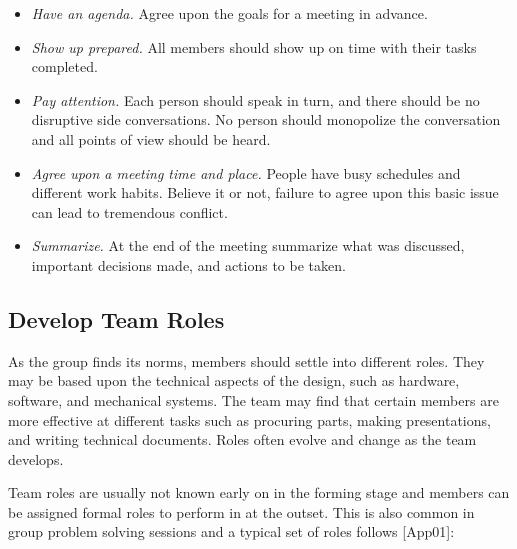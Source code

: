 \begin{itemize}
\item
  \emph{Have an agenda.} Agree upon the goals for a meeting in advance.
\item
  \emph{Show up prepared.} All members should show up on time with their
  tasks completed.
\item
  \emph{Pay attention.} Each person should speak in turn, and there
  should be no disruptive side conversations. No person should
  monopolize the conversation and all points of view should be heard.
\item
  \emph{Agree upon a meeting time and place.} People have busy schedules
  and different work habits. Believe it or not, failure to agree upon
  this basic issue can lead to tremendous conflict.
\item
  \emph{Summarize.} At the end of the meeting summarize what was
  discussed, important decisions made, and actions to be taken.
\end{itemize}

\subsection{Develop Team Roles}
\label{subsection:develop-team-roles}

As the group finds its norms, members should settle into different
roles. They may be based upon the technical aspects of the design, such
as hardware, software, and mechanical systems. The team may find that
certain members are more effective at different tasks such as procuring
parts, making presentations, and writing technical documents. Roles
often evolve and change as the team develops.

Team roles are usually not known early on in the forming stage and
members can be assigned formal roles to perform in at the outset. This
is also common in group problem solving sessions and a typical set of
roles follows {[}App01{]}:

